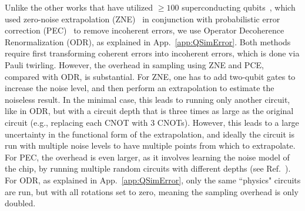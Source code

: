 \documentclass[aps, pra, onecolumn, tightenlines, letterpaper, amsmath, amssymb, preprintnumbers, floatfix, longbibliography, nofootinbib]{revtex4-2}
\begin{document}
Unlike the other works that have utilized $\geq 100$ superconducting qubits~\cite{Yu:2022ivm,Kim:2023bwr,Shtanko:2023tjn}, which used zero-noise extrapolation (ZNE)~\cite{Li:2016vmf,Temme:2016vkz,2020arXiv200510921G} in conjunction with probabilistic error correction (PEC)~\cite{Temme:2016vkz,Berg:2022ugn} to remove incoherent errors, 
we use Operator Decoherence Renormalization (ODR), as explained in App.~\ref{app:QSimError}. 
Both methods require first transforming coherent errors into incoherent errors, which is done via Pauli twirling. However, the overhead in sampling using ZNE and PCE, compared with ODR, is substantial. For ZNE, one has to add two-qubit gates to increase the noise level, and then perform an extrapolation to estimate the noiseless result. In the minimal case, this leads to running only another circuit, like in ODR, but with a circuit depth that is three times as large as the original circuit (e.g., replacing each CNOT with 3 CNOTs). 
However, this leads to a large uncertainty in the functional form of the extrapolation, and ideally the circuit is run with multiple noise levels to have multiple points from which to extrapolate. For PEC, the overhead is even larger, as it involves learning the noise model of the chip, by running multiple random circuits with different depths (see Ref.~\cite{Berg:2022ugn}). For ODR, as explained in App.~\ref{app:QSimError}, only the same ``physics" circuits are run, but with all rotations set to zero, meaning the sampling overhead is only doubled.
\end{document}
